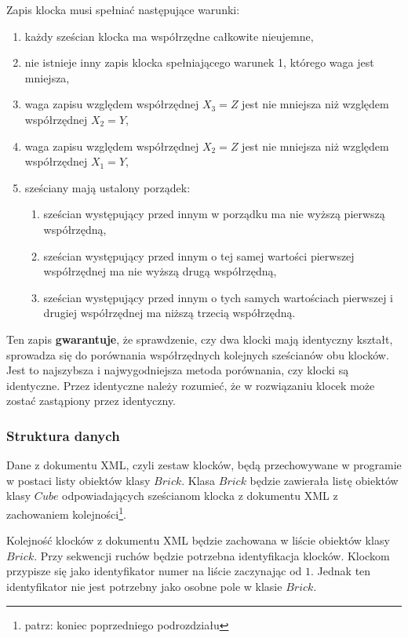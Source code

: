 \documentclass[12pt]{article}
\begin{document}
Zapis klocka musi spełniać następujące warunki:
\begin{enumerate}
	\item każdy sześcian klocka ma współrzędne całkowite nieujemne,
	\item nie istnieje inny zapis klocka spełniającego warunek 1, którego
		waga jest mniejsza,
	\item waga zapisu względem współrzędnej $X_3=Z$ jest nie mniejsza niż 
		względem współrzędnej $X_2=Y$,
	\item waga zapisu względem współrzędnej $X_2=Z$ jest nie mniejsza niż 
		względem współrzędnej $X_1=Y$,
	\item sześciany mają ustalony porządek:
		\begin{enumerate}
			\item sześcian występujący przed innym w porządku ma nie wyższą
				pierwszą współrzędną,
			\item sześcian występujący przed innym o tej samej wartości
				pierwszej współrzędnej ma nie wyższą drugą współrzędną,
			\item sześcian występujący przed innym o tych samych wartościach
				pierwszej i drugiej współrzędnej ma niższą trzecią współrzędną.
		\end{enumerate}
\end{enumerate}
Ten zapis \textbf{gwarantuje}, że sprawdzenie, czy dwa klocki mają
identyczny kształt, sprowadza się do porównania współrzędnych kolejnych
sześcianów obu klocków. Jest to najszybsza i najwygodniejsza metoda
porównania, czy klocki są identyczne. Przez identyczne należy rozumieć,
że w rozwiązaniu klocek może zostać zastąpiony przez identyczny.

\subsubsection{Struktura danych}
Dane z dokumentu XML, czyli zestaw klocków, będą przechowywane w programie
w postaci listy obiektów klasy $Brick$. Klasa $Brick$ będzie zawierała
listę obiektów klasy $Cube$ odpowiadających sześcianom klocka z dokumentu
XML z zachowaniem kolejności\footnote{patrz: koniec poprzedniego
podrozdziału}.

Kolejność klocków z dokumentu XML będzie zachowana w liście obiektów klasy
$Brick$. Przy sekwencji ruchów będzie potrzebna identyfikacja klocków.
Klockom przypisze się jako identyfikator numer na liście zaczynając od $1$.
Jednak ten identyfikator nie jest potrzebny jako osobne pole w klasie
$Brick$.
\end{document}
